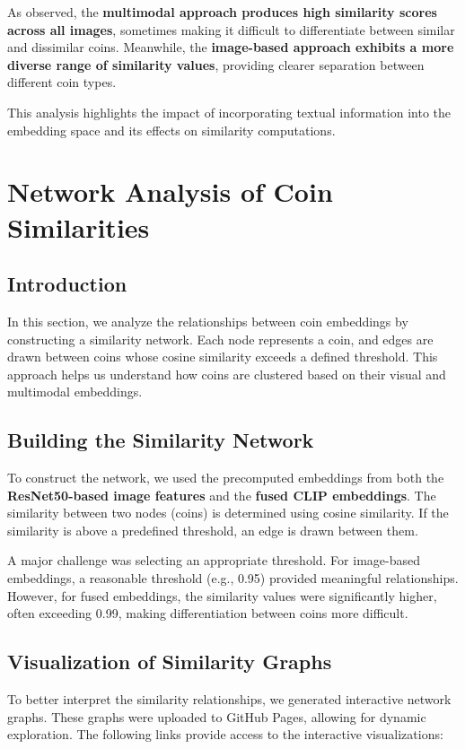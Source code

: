 \documentclass[nolibertine, english, algorithm, nomencl, minted]{ttlab-qualify}
\begin{document}
As observed, the \textbf{multimodal approach produces high similarity scores across all images}, 
sometimes making it difficult to differentiate between similar and dissimilar coins. 
Meanwhile, the \textbf{image-based approach exhibits a more diverse range of similarity values}, 
providing clearer separation between different coin types.

This analysis highlights the impact of incorporating textual information into the embedding space and its effects on 
similarity computations.


\section{Network Analysis of Coin Similarities}
\label{sec:network_analysis}

\subsection{Introduction}
In this section, we analyze the relationships between coin embeddings by constructing a similarity network. 
Each node represents a coin, and edges are drawn between coins whose cosine similarity exceeds a defined threshold. 
This approach helps us understand how coins are clustered based on their visual and multimodal embeddings.

\subsection{Building the Similarity Network}
To construct the network, we used the precomputed embeddings from both the \textbf{ResNet50-based image features} 
and the \textbf{fused CLIP embeddings}. The similarity between two nodes (coins) is determined using cosine similarity. 
If the similarity is above a predefined threshold, an edge is drawn between them.

A major challenge was selecting an appropriate threshold. For image-based embeddings, 
a reasonable threshold (e.g., 0.95) provided meaningful relationships. However, for fused embeddings, 
the similarity values were significantly higher, often exceeding 0.99, making differentiation between coins more difficult.

\subsection{Visualization of Similarity Graphs}
To better interpret the similarity relationships, we generated interactive network graphs. 
These graphs were uploaded to GitHub Pages, allowing for dynamic exploration. 
The following links provide access to the interactive visualizations:
\end{document}
